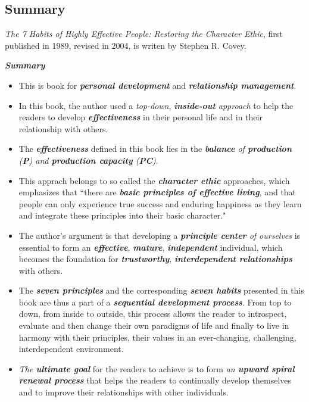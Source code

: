 \documentclass[11pt]{article}
\begin{document}
\subsection{Summary}
\emph{The 7 Habits of Highly Effective People: Restoring the Character Ethic}, first published in 1989, revised in 2004, is writen by Stephen R. Covey. 

\emph{\textbf{Summary}}
\begin{itemize}
\item This is book for \emph{\textbf{personal development}} and \emph{\textbf{relationship management}}. 

\item In this book, the author used a \emph{top-down}, \emph{\textbf{inside-out} approach} to help the readers to develop \emph{\textbf{effectiveness}} in their personal life and in their relationship with others. 

\item The \emph{\textbf{effectiveness}} defined in this book lies in the \emph{\textbf{balance} of \textbf{production} (\textbf{P}) and \textbf{production capacity} (\textbf{PC})}.

\item This apprach belongs to so called the \emph{\textbf{character ethic}} approaches, which emphasizes that ``there are \emph{\textbf{basic principles of effective living}}, and that people can only experience true success and enduring happiness as they learn and integrate these principles into their basic character."

\item The author's argument is that developing a \emph{\textbf{principle center} of ourselves} is essential to form an \emph{\textbf{effective}}, \emph{\textbf{mature}}, \emph{\textbf{independent}} individual, which becomes the foundation for \emph{\textbf{trustworthy}}, \emph{\textbf{interdependent  relationships}} with others.

\item The \emph{\textbf{seven principles}} and the corresponding \emph{\textbf{seven habits}} presented in this book are thus a part of a \emph{\textbf{sequential development process}}. From top to down, from inside to outside, this process allows the reader to introspect, evaluate and then change their own paradigms of life and finally to live in harmony with their principles, their values in an ever-changing, challenging, interdependent environment.

\item \emph{The \textbf{ultimate goal}} for the readers to achieve is to form \emph{an \textbf{upward spiral renewal process}} that helps the readers to continually develop themselves and to improve their relationships with other individuals. 
\end{itemize}
\end{document}
